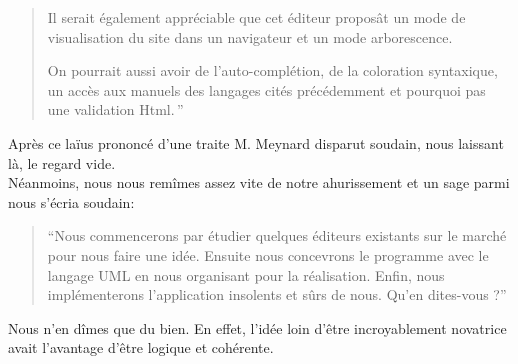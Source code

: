 \documentclass[a4paper, 12pt]{report}
\begin{document}
\begin{chapter}
\begin{quotation}
		Il serait également appréciable que cet éditeur proposât un mode de visualisation du site dans un navigateur et un mode arborescence.

		On pourrait aussi avoir de l'\gls{auto-complétion}, de la coloration syntaxique, un accès aux manuels des langages cités précédemment et pourquoi
		pas une validation Html.\,''
	\end{quotation}

	Après ce laïus prononcé d'une traite M. Meynard disparut soudain, nous laissant là, le regard vide.\\


	Néanmoins, nous nous remîmes assez vite de notre ahurissement et un sage parmi nous s'écria soudain:
	\begin{quotation}
		``Nous commencerons par étudier quelques éditeurs existants sur le marché pour nous faire une idée. Ensuite nous concevrons
		le programme avec le langage UML en nous organisant pour la réalisation.
		Enfin, nous implémenterons l'application insolents et sûrs de nous.	Qu'en dites-vous ?''
	\end{quotation}

	Nous n'en dîmes que du bien. En effet, l'idée loin d'être incroyablement novatrice avait l'avantage d'être logique et cohérente.
	
	\end{chapter}
\end{document}
